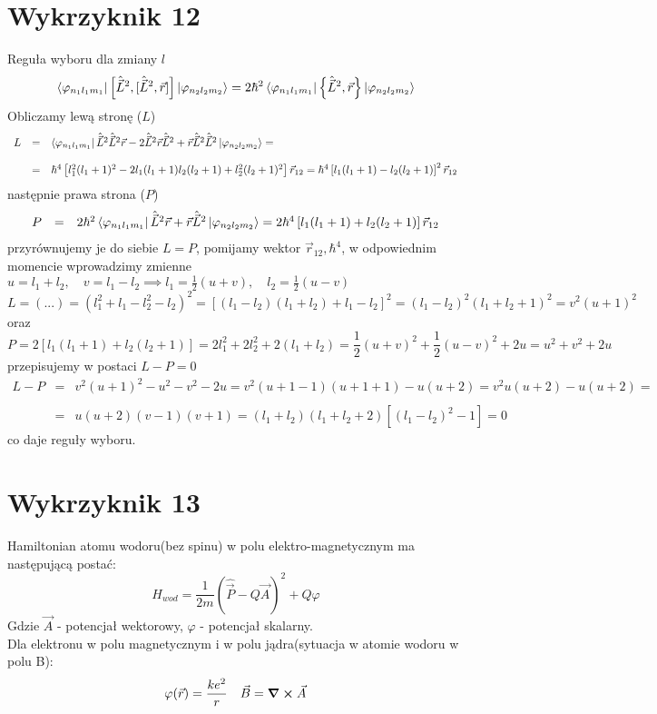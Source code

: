 \documentclass[a4paper,12pt]{article}
\begin{document}
\section{Wykrzyknik 12}
Reguła wyboru dla zmiany $l$
$$
	\bra{\varphi_{n_1l_1m_1}}\left[\hat{\vec{L}}^2,[\hat{\vec{L}}^2,\vec{r}]\right]\ket{\varphi_{n_2l_2m_2}} = 2\hbar^2\bra{\varphi_{n_1l_1m_1}}\left\{\hat{\vec{L}}^2,\vec{r}\right\} \ket{\varphi_{n_2l_2m_2}}
$$
Obliczamy lewą stronę ($L$)
$$
\begin{array}{lll}
	L &=& \bra{\varphi_{n_1l_1m_1}} \hat{\vec{L}}^2 \hat{\vec{L}}^2\vec{r}- 2\hat{\vec{L}}^2\vec{r}\hat{\vec{L}}^2+\vec{r}\hat{\vec{L}}^2\hat{\vec{L}}^2\ket{\varphi_{n_2l_2m_2}} =\\\\
	&=& \hbar^4\left[l_1^2(l_1+1)^2-2l_1(l_1+1)l_2(l_2+1)+l_2^2(l_2+1)^2 \right]\vec{r}_{12} = \hbar^4\left[l_1(l_1+1)-l_2(l_2+1)\right]^2\vec{r}_{12}
\end{array}
$$
następnie prawa strona ($P$)
$$
\begin{array}{lll}
	P &=& 2\hbar^2\bra{\varphi_{n_1l_1m_1}}\hat{\vec{L}}^2\vec{r}+\vec{r}\hat{\vec{L}}^2\ket{\varphi_{n_2l_2m_2}} = 2\hbar^4\left[l_1(l_1+1)+l_2(l_2+1)\right]\vec{r}_{12}
\end{array}
$$
przyrównujemy je do siebie $L=P$, pomijamy wektor $\vec{r}_{12}, \hbar^4$, w odpowiednim momencie wprowadzimy zmienne $u = l_1+l_2,\quad v = l_1-l_2\implies l_1=\frac{1}{2}(u+v),\quad l_2 = \frac{1}{2}(u-v)$
$$
	L = (...) = (l_1^2+l_1-l_2^2-l_2)^2 = [(l_1-l_2)(l_1+l_2)+l_1-l_2]^2 = (l_1-l_2)^2 (l_1+l_2+1)^2 = v^2 (u+1)^2
$$
oraz
$$
	P = 2[l_1(l_1+1)+l_2(l_2+1)] = 2l_1^2+2l_2^2+2(l_1+l_2) = \frac{1}{2}(u+v)^2+\frac{1}{2}(u-v)^2+2u = u^2+v^2+2u
$$
przepisujemy w postaci $L-P=0$
$$
\begin{array}{lll}
	L-P &=& v^2(u+1)^2-u^2-v^2-2u = v^2(u+1-1)(u+1+1) - u(u+2) = v^2u(u+2)-u(u+2) =\\\\ &=& u(u+2)(v-1)(v+1) = (l_1+l_2)(l_1+l_2+2)[(l_1-l_2)^2-1] = 0
\end{array}
$$
co daje reguły wyboru.

\section{Wykrzyknik 13}
Hamiltonian atomu wodoru(bez spinu) w polu elektro-magnetycznym ma następującą postać:
$$H_{wod} = \frac{1}{2m}(\hat{\vec{P}}-Q\vec{A})^{2} + Q\varphi$$
Gdzie $\vec{A}$ - potencjał wektorowy, $\varphi$ - potencjał skalarny. \\
Dla elektronu w polu magnetycznym i w polu jądra(sytuacja w atomie wodoru w polu B):
\begin{align*}
\varphi(\vec{r}) = \frac{ke^2}{r} && \vec{B} = \curl{\vec{A}}
\end{align*}
\end{document}
